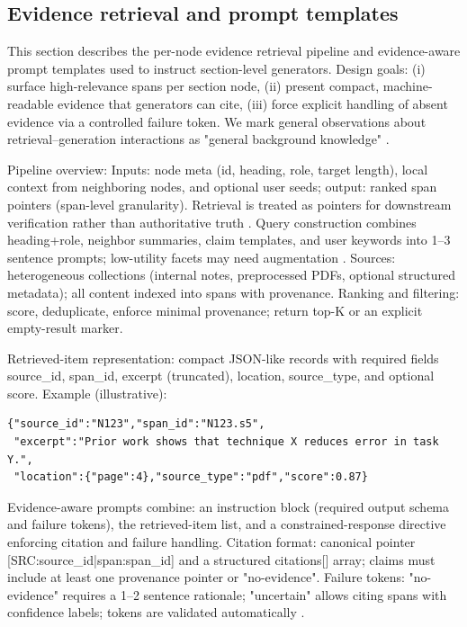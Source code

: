 \documentclass{article}%
\begin{document}
%
\subsection{Evidence retrieval and prompt templates}%


%
This section describes the per-node evidence retrieval pipeline and evidence-aware prompt templates used to instruct section-level generators.
Design goals: (i) surface high-relevance spans per section node, (ii) present compact, machine-readable evidence that generators can cite, (iii) force explicit handling of absent evidence via a controlled failure token.
We mark general observations about retrieval–generation interactions as "general background knowledge" \cite{web_huo_2023_retrieving_supporting_evidence_for_generative_qu}.

Pipeline overview:
Inputs: node meta (id, heading, role, target length), local context from neighboring nodes, and optional user seeds; output: ranked span pointers (span-level granularity).
Retrieval is treated as pointers for downstream verification rather than authoritative truth \cite{web_huo_2023_retrieving_supporting_evidence_for_generative_qu}.
Query construction combines heading+role, neighbor summaries, claim templates, and user keywords into 1–3 sentence prompts; low-utility facets may need augmentation \cite{web_macavaney_2018_overcoming_low_utility_facets_for_complex_answer}.
Sources: heterogeneous collections (internal notes, preprocessed PDFs, optional structured metadata); all content indexed into spans with provenance.
Ranking and filtering: score, deduplicate, enforce minimal provenance; return top-K or an explicit empty-result marker.

Retrieved-item representation: compact JSON-like records with required fields source_id, span_id, excerpt (truncated), location, source_type, and optional score.
Example (illustrative):
\begin{verbatim}
{"source_id":"N123","span_id":"N123.s5",
 "excerpt":"Prior work shows that technique X reduces error in task Y.",
 "location":{"page":4},"source_type":"pdf","score":0.87}
\end{verbatim}

Evidence-aware prompts combine: an instruction block (required output schema and failure tokens), the retrieved-item list, and a constrained-response directive enforcing citation and failure handling.
Citation format: canonical pointer [SRC:source_id|span:span_id] and a structured citations[] array; claims must include at least one provenance pointer or "no-evidence".
Failure tokens: "no-evidence" requires a 1–2 sentence rationale; "uncertain" allows citing spans with confidence labels; tokens are validated automatically \cite{web_wang_2025_derag_black_box_adversarial_attacks_on_multiple_}.
\end{document}
